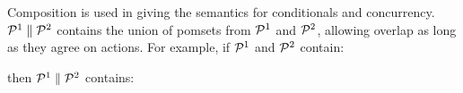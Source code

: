 Composition is used in giving the semantics for conditionals and concurrency.
$\mathcal{P}^1 \parallel \mathcal{P}^2$ contains the union of pomsets from $\mathcal{P}^1$ and
$\mathcal{P}^2$, allowing overlap as long as they agree on actions. For example, if
$\mathcal{P}^1$ and $\mathcal{P}^2$ contain:
\begin{tikzdisplay}[node distance=1em]
\end{tikzdisplay}
then $\mathcal{P}^1 \parallel \mathcal{P}^2$ contains:
\begin{tikzdisplay}[node distance=1em]
\end{tikzdisplay}



